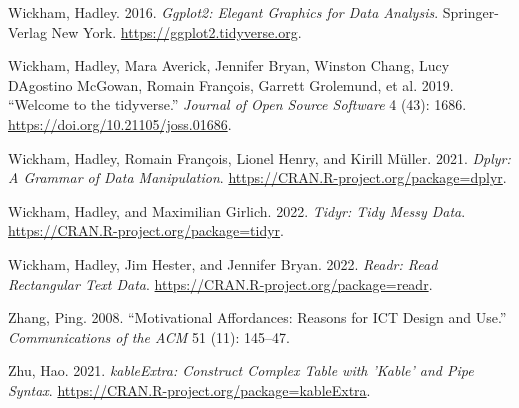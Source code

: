 \documentclass[
]{article}
\newlength{\cslhangindent}
\newlength{\cslentryspacingunit} %
\newenvironment{CSLReferences}[2] %
 {%
  \setlength{\parindent}{0pt}
  \ifodd #1
  \let\oldpar\par
  \def\par{\hangindent=\cslhangindent\oldpar}
  \fi
  \setlength{\parskip}{#2\cslentryspacingunit}
 }%
 {}
\begin{document}
\begin{CSLReferences}{1}{0}
\leavevmode{}%
Wickham, Hadley. 2016. \emph{Ggplot2: Elegant Graphics for Data Analysis}. Springer-Verlag New York. \url{https://ggplot2.tidyverse.org}.

\leavevmode{}%
Wickham, Hadley, Mara Averick, Jennifer Bryan, Winston Chang, Lucy DAgostino McGowan, Romain François, Garrett Grolemund, et al. 2019. {``Welcome to the {tidyverse}.''} \emph{Journal of Open Source Software} 4 (43): 1686. \url{https://doi.org/10.21105/joss.01686}.

\leavevmode{}%
Wickham, Hadley, Romain François, Lionel Henry, and Kirill Müller. 2021. \emph{Dplyr: A Grammar of Data Manipulation}. \url{https://CRAN.R-project.org/package=dplyr}.

\leavevmode{}%
Wickham, Hadley, and Maximilian Girlich. 2022. \emph{Tidyr: Tidy Messy Data}. \url{https://CRAN.R-project.org/package=tidyr}.

\leavevmode{}%
Wickham, Hadley, Jim Hester, and Jennifer Bryan. 2022. \emph{Readr: Read Rectangular Text Data}. \url{https://CRAN.R-project.org/package=readr}.

\leavevmode{}%
Zhang, Ping. 2008. {``Motivational Affordances: Reasons for ICT Design and Use.''} \emph{Communications of the ACM} 51 (11): 145--47.

\leavevmode{}%
Zhu, Hao. 2021. \emph{kableExtra: Construct Complex Table with 'Kable' and Pipe Syntax}. \url{https://CRAN.R-project.org/package=kableExtra}.

\end{CSLReferences}
\end{document}
